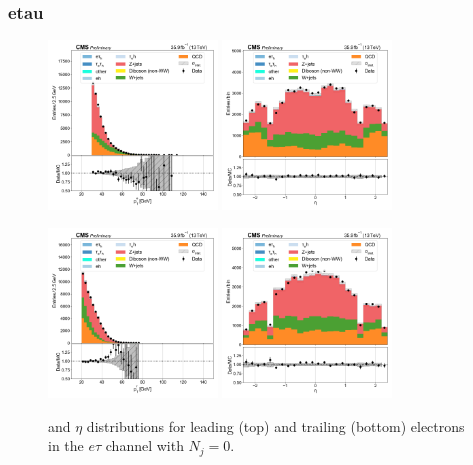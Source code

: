 \subsubsection{etau}

\begin{figure}[htb!]
    \centering
    \includegraphics[width=0.4\textwidth]{chapters/Analysis/sectionPlots/figures/data_mc_overlays/etau_2016_cat_eq0_eq0_signal_linear_lepton_lepton1_pt}
    \includegraphics[width=0.4\textwidth]{chapters/Analysis/sectionPlots/figures/data_mc_overlays/etau_2016_cat_eq0_eq0_signal_linear_lepton_lepton1_eta}

    \includegraphics[width=0.4\textwidth]{chapters/Analysis/sectionPlots/figures/data_mc_overlays/etau_2016_cat_eq0_eq0_signal_linear_lepton_lepton2_pt}
    \includegraphics[width=0.4\textwidth]{chapters/Analysis/sectionPlots/figures/data_mc_overlays/etau_2016_cat_eq0_eq0_signal_linear_lepton_lepton2_eta}
    \caption{\pt and $\eta$ distributions for leading (top) and trailing
    (bottom) electrons in the $e\tau$ channel with $N_{j} = 0$.}
    \label{fig:analysis:plots:etau_1_kinematic}
\end{figure}


